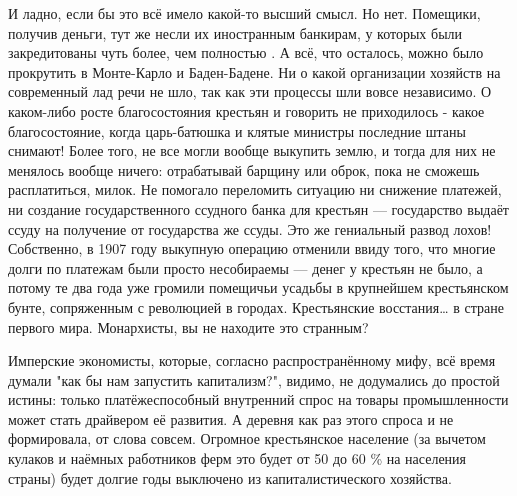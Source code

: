 И ладно, если бы это всё имело какой-то высший смысл. Но нет. Помещики, получив деньги, тут же несли их иностранным банкирам, у которых были закредитованы чуть более, чем полностью . А всё, что осталось, можно было прокрутить в Монте-Карло и Баден-Бадене. Ни о какой организации хозяйств на современный лад речи не шло, так как эти процессы шли вовсе независимо. О каком-либо росте благосостояния крестьян и говорить не приходилось - какое благосостояние, когда царь-батюшка и клятые министры последние штаны снимают! Более того, не все могли вообще выкупить землю, и тогда для них не менялось вообще ничего: отрабатывай барщину или оброк, пока не сможешь расплатиться, милок. Не помогало переломить ситуацию ни снижение платежей, ни создание государственного ссудного банка для крестьян — государство выдаёт ссуду на получение от государства же ссуды. Это же гениальный развод лохов! Собственно, в 1907 году выкупную операцию отменили ввиду того, что многие долги по платежам были просто несобираемы — денег у крестьян не было, а потому те два года уже громили помещичьи усадьбы в крупнейшем крестьянском бунте, сопряженным с революцией в городах. Крестьянские восстания… в стране первого мира. Монархисты, вы не находите это странным?

Имперские экономисты, которые, согласно распространённому мифу, всё время думали "как бы нам запустить капитализм?", видимо, не додумались до простой истины: только платёжеспособный внутренний спрос на товары промышленности может стать драйвером её развития. А деревня как раз этого спроса и не формировала, от слова совсем. Огромное крестьянское население (за вычетом кулаков и наёмных работников ферм это будет от 50 до 60 \% на населения страны) будет долгие годы выключено из капиталистического хозяйства.

